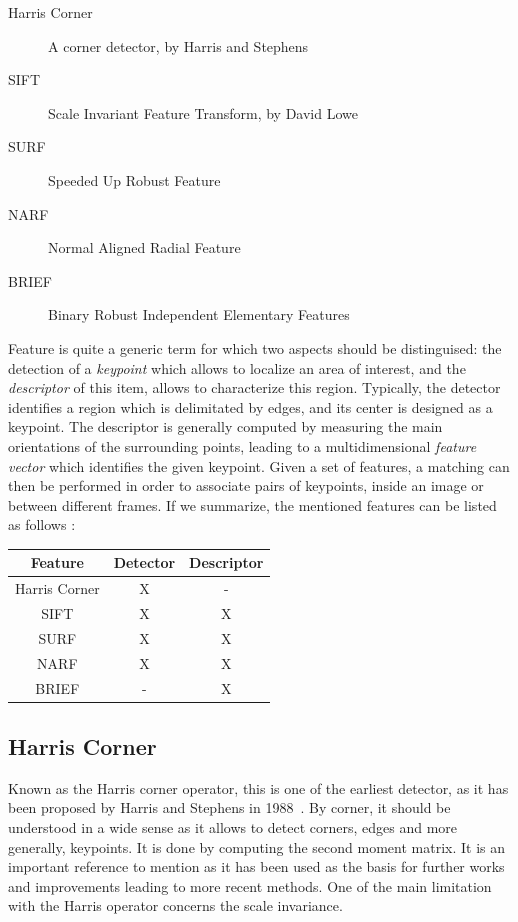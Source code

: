 \begin{description}
\item[Harris Corner] A corner detector, by Harris and Stephens~\cite{Harris88alvey}
\item[SIFT] Scale Invariant Feature Transform, by David Lowe~\cite{lowe_2004_sift} 
\item[SURF] Speeded Up Robust Feature~\cite{surf}
\item[NARF] Normal Aligned Radial Feature~\cite{steder10irosws}
\item[BRIEF] Binary Robust Independent Elementary Features~\cite{Calonder10-brief}
\end{description}

Feature is quite a generic term for which two aspects should be distinguised: the detection of a \emph{keypoint} which allows to localize an area of interest, and the \emph{descriptor} of this item, allows to characterize this region. Typically, the detector identifies a region which is delimitated by edges, and its center is designed as a keypoint. The descriptor is generally computed by measuring the main orientations of the surrounding points, leading to a multidimensional \emph{feature vector} which identifies the given keypoint. Given a set of features, a matching can then be performed in order to associate pairs of keypoints, inside an image or between different frames. If we summarize, the mentioned features can be listed as follows :

\begin{center}
\begin{tabular}{|c|cc|}
\hline
Feature & Detector & Descriptor \\
\hline
Harris Corner & X & - \\
SIFT & X & X \\
SURF & X & X \\
NARF & X & X \\
BRIEF & - & X \\
\hline
\end{tabular}
\end{center}

\subsection{Harris Corner}

Known as the Harris corner operator, this is one of the earliest detector, as it has been proposed by Harris and Stephens in 1988~\cite{Harris88alvey}. By corner, it should be understood in a wide sense as it allows to detect corners, edges and more generally, keypoints. It is done by computing the second moment matrix. It is an important reference to mention as it has been used as the basis for further works and improvements leading to more recent methods. One of the main limitation with the Harris operator concerns the scale invariance.

